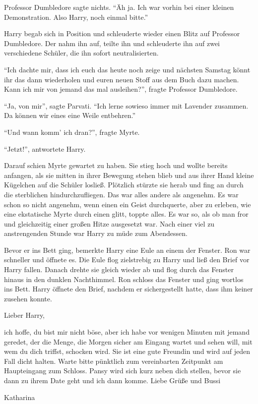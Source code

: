 Professor Dumbledore sagte nichts. \enquote{Äh ja. Ich war vorhin bei einer kleinen Demonstration. Also Harry, noch einmal bitte.}

Harry begab sich in Position und schleuderte wieder einen Blitz auf Professor Dumbledore. Der nahm ihn auf, teilte ihn und schleuderte ihn auf zwei verschiedene Schüler, die ihn sofort neutralisierten.

\enquote{Ich dachte mir, dass ich euch das heute noch zeige und nächsten Samstag könnt ihr das dann wiederholen und euren neuen Stoff aus dem Buch dazu machen. Kann ich mir von jemand das mal ausleihen?}, fragte Professor Dumbledore.

\enquote{Ja, von mir}, sagte Parvati. \enquote{Ich lerne sowieso immer mit Lavender zusammen. Da können wir eines eine Weile entbehren.}

\enquote{Und wann komm' ich dran?}, fragte Myrte.

\enquote{Jetzt!}, antwortete Harry.

Darauf schien Myrte gewartet zu haben. Sie stieg hoch und wollte bereits anfangen, als sie mitten in ihrer Bewegung stehen blieb und aus ihrer Hand kleine Kügelchen auf die Schüler losließ. Plötzlich stürzte sie herab und fing an durch die sterblichen hindurchzufliegen. Das war alles andere als angenehm. Es war schon so nicht angenehm, wenn einen ein Geist durchquerte, aber zu erleben, wie eine ekstatische Myrte durch einen glitt, toppte alles. Es war so, als ob man fror und gleichzeitig einer großen Hitze ausgesetzt war. Nach einer viel zu anstrengenden Stunde war Harry zu müde zum Abendessen.

Bevor er ins Bett ging, bemerkte Harry eine Eule an einem der Fenster. Ron war schneller und öffnete es. Die Eule flog zielstrebig zu Harry und ließ den Brief vor Harry fallen. Danach drehte sie gleich wieder ab und flog durch das Fenster hinaus in den dunklen Nachthimmel. Ron schloss das Fenster und ging wortlos ins Bett. Harry öffnete den Brief, nachdem er sichergestellt hatte, dass ihm keiner zusehen konnte.

\begin{brief}
Lieber Harry,

ich hoffe, du bist mir nicht böse, aber ich habe vor wenigen Minuten mit jemand geredet, der die Menge, die Morgen sicher am Eingang wartet und sehen will, mit wem du dich triffst, schocken wird. Sie ist eine gute Freundin und wird auf jeden Fall dicht halten. Warte bitte pünktlich zum vereinbarten Zeitpunkt am Haupteingang zum Schloss. Pansy wird sich kurz neben dich stellen, bevor sie dann zu ihrem Date geht und ich dann komme.
\signumspace
Liebe Grüße und Bussi

Katharina
\end{brief}


